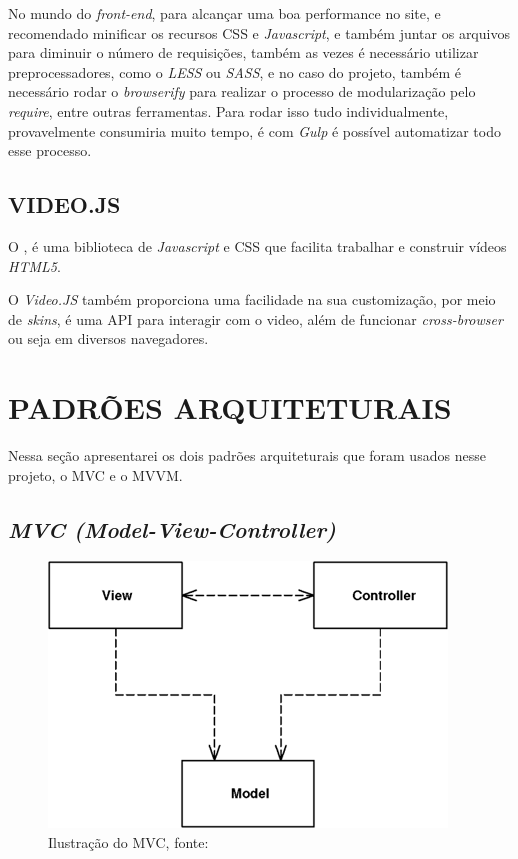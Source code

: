 No mundo do \textit{front-end}, para alcançar uma boa performance no site, e recomendado minificar os recursos \ac{CSS} e \textit{Javascript}, e também juntar os arquivos para diminuir o número de requisições, também as vezes é necessário utilizar preprocessadores, como o \textit{LESS} ou \textit{SASS}, e no caso do projeto, também é necessário rodar o \textit{browserify} para realizar o processo de modularização pelo \textit{require}, entre outras ferramentas. Para rodar isso tudo individualmente, provavelmente consumiria muito tempo, é com \textit{Gulp} é possível automatizar todo esse processo.

\subsection{VIDEO.JS}
O , é uma biblioteca de \textit{Javascript} e \ac{CSS} que facilita trabalhar e construir vídeos \textit{HTML5}.

O \textit{Video.JS} também proporciona uma facilidade na sua customização, por meio de \textit{skins}, é uma \ac{API} para interagir com o video, além de funcionar \textit{cross-browser} ou seja em diversos navegadores.

\newpage
\section{PADRÕES ARQUITETURAIS}
Nessa seção apresentarei os dois padrões arquiteturais que foram usados nesse projeto, o \ac{MVC} e o \ac{MVVM}.

\subsection{\textit{MVC (Model-View-Controller)}}
\label{sec:mvc}

    \begin{figure}[h]
        \centering
        \includegraphics[keepaspectratio=true,scale=0.7]{figuras/mvc-fowler.png}
        \caption{Ilustração do \ac{MVC}, fonte: \cite{martin_fowler_patterns}}
        \label{fig:mvc-fowler}
    \end{figure}

